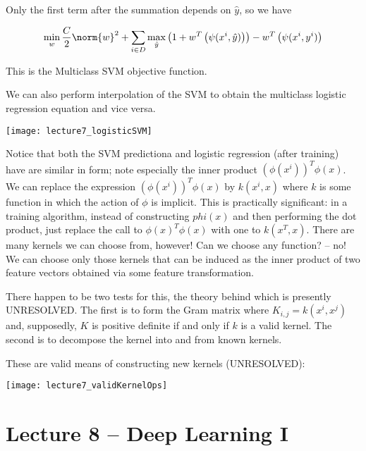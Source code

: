 \documentclass[../main.tex]{subfiles}
\begin{document}
\begin{definition}
    Only the first term after the summation depends on $\hat{y}$, so we have

    \[
        \min_{w} \frac{C}{2}\norm{w}^2 + \sum_{i \in D}^{} \max_{\hat{y}} \left(1 + w^T\left( \psi(x^{i}, \hat{y})\right)\right) - w^T\left( \psi(x^{i},y^{i})\right) 
    \]

    \breathe

    This is the Multiclass SVM objective function.
    
\end{definition}

\begin{remark}
    We can also perform interpolation of the SVM to obtain the multiclass logistic regression equation and vice versa.

    \begin{center}
        \texttt{[image: lecture7\_logisticSVM]}
    \end{center}

    Notice that both the SVM predictiona and logistic regression (after training) have are similar in form; note especially the inner product $\left(\phi(x^{i})\right)^T\phi(x)$. We can replace the expression $\left(\phi(x^{i})\right)^T\phi(x)$ by $k(x^{i},x)$ where $k$ is some function in which the action of $\phi$ is implicit. This is practically significant: in a training algorithm, instead of constructing $phi(x)$ and then performing the dot product, just replace the call to $\phi(x)^T\phi(x)$ with one to $k(x^T,x)$. There are many kernels we can choose from, however! Can we choose any function? -- no! We can choose only those kernels that can be induced as the inner product of two feature vectors obtained via some feature transformation.

    There happen to be two tests for this, the theory behind which is presently UNRESOLVED. The first is to form the Gram matrix where $K_{i,j} = k(x^{i}, x^{j})$ and, supposedly, $K$ is positive definite if and only if $k$ is a valid kernel. The second is to decompose the kernel into and from known kernels.


    These are valid means of constructing new kernels (UNRESOLVED):
    \begin{center}
        \texttt{[image: lecture7\_validKernelOps]}
    \end{center}
\end{remark}

\section{Lecture 8 -- Deep Learning I}
\end{document}
